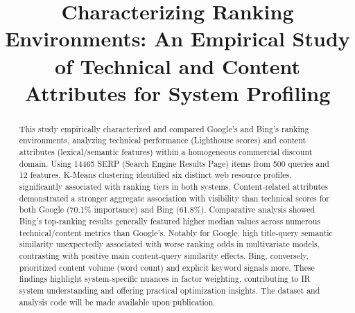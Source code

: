\documentclass[a4paper,fleqn]{cas-sc}
\begin{document}
\let\WriteBookmarks\relax
\def\floatpagepagefraction{1}
\def\textpagefraction{.001}


\shortauthors{}

\title [mode = title]{Characterizing Ranking Environments: An Empirical Study of Technical and Content Attributes for System Profiling}                      
\tnotemark[1,2]







\begin{abstract}
This study empirically characterized and compared Google's and Bing's ranking environments, analyzing technical performance (Lighthouse scores) and content attributes (lexical/semantic features) within a homogeneous commercial discount domain. Using \num{14465} SERP (Search Engine Results Page) items from 500 queries and 12 features, K-Means clustering identified six distinct web resource profiles, significantly associated with ranking tiers in both systems. Content-related attributes demonstrated a stronger aggregate association with visibility than technical scores for both Google (70.1\% importance) and Bing (61.8\%). Comparative analysis showed Bing's top-ranking results generally featured higher median values across numerous technical/content metrics than Google's. Notably for Google, high title-query semantic similarity unexpectedly associated with worse ranking odds in multivariate models, contrasting with positive main content-query similarity effects. Bing, conversely, prioritized content volume (word count) and explicit keyword signals more. These findings highlight system-specific nuances in factor weighting, contributing to IR system understanding and offering practical optimization insights. The dataset and analysis code will be made available upon publication.
\end{abstract}
\end{document}
